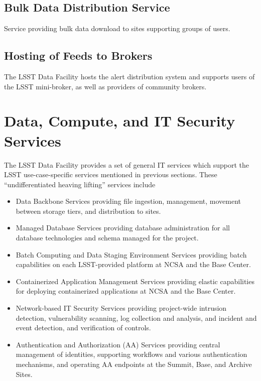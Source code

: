 \subsection{Bulk Data Distribution Service}
Service providing bulk data download to sites supporting groups of users.


\subsection{Hosting of Feeds to Brokers}
The LSST Data Facility hosts the alert distribution system and supports users of 
the LSST mini-broker, as well as providers of community brokers.



\section{Data, Compute, and IT Security Services}
The LSST Data Facility provides a set of general IT services which support the 
LSST use-case-specific services mentioned in previous sections. These 
``undifferentiated heaving lifting'' services include

\begin{itemize}
\item Data Backbone Services providing file ingestion, management, movement 
between storage tiers, and distribution to sites.
\item Managed Database Services providing database administration for all 
database technologies and schema managed for the project.
\item Batch Computing and Data Staging Environment Services providing batch 
capabilities on each LSST-provided platform at NCSA and the Base Center. 
\item Containerized Application Management Services providing elastic 
capabilities for deploying containerized applications at NCSA and the Base Center.
\item Network-based IT Security Services providing project-wide intrusion 
detection, vulnerability scanning, log collection and analysis, and incident and 
event detection, and verification of controls.
\item Authentication and Authorization (AA) Services providing central management of
identities, supporting workflows and various authentication mechanisms, and 
operating AA endpoints at the Summit, Base, and Archive Sites.
\end{itemize}

